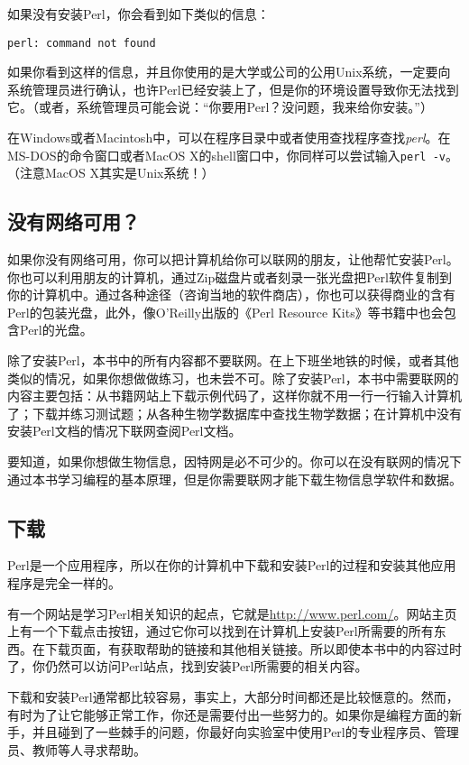 如果没有安装Perl，你会看到如下类似的信息：

\begin{verbatim}
perl: command not found
\end{verbatim}

如果你看到这样的信息，并且你使用的是大学或公司的公用Unix系统，一定要向系统管理员进行确认，也许Perl已经安装上了，但是你的环境设置导致你无法找到它。（或者，系统管理员可能会说：“你要用Perl？没问题，我来给你安装。”）

在Windows或者Macintosh中，可以在程序目录中或者使用查找程序查找\textit{perl}。在MS-DOS的命令窗口或者MacOS X的shell窗口中，你同样可以尝试输入\verb|perl -v|。（注意MacOS X其实是Unix系统！）

\subsection{没有网络可用？}
如果你没有网络可用，你可以把计算机给你可以联网的朋友，让他帮忙安装Perl。你也可以利用朋友的计算机，通过Zip磁盘片或者刻录一张光盘把Perl软件复制到你的计算机中。通过各种途径（咨询当地的软件商店），你也可以获得商业的含有Perl的包装光盘，此外，像O'Reilly出版的《Perl Resource Kits》等书籍中也会包含Perl的光盘。

除了安装Perl，本书中的所有内容都不要联网。在上下班坐地铁的时候，或者其他类似的情况，如果你想做做练习，也未尝不可。除了安装Perl，本书中需要联网的内容主要包括：从书籍网站上下载示例代码了，这样你就不用一行一行输入计算机了；下载并练习测试题；从各种生物学数据库中查找生物学数据；在计算机中没有安装Perl文档的情况下联网查阅Perl文档。

要知道，如果你想做生物信息，因特网是必不可少的。你可以在没有联网的情况下通过本书学习编程的基本原理，但是你需要联网才能下载生物信息学软件和数据。

\subsection{下载}
Perl是一个应用程序，所以在你的计算机中下载和安装Perl的过程和安装其他应用程序是完全一样的。

有一个网站是学习Perl相关知识的起点，它就是\href{http://www.perl.com/}{http://www.perl.com/}。网站主页上有一个下载点击按钮，通过它你可以找到在计算机上安装Perl所需要的所有东西。在下载页面，有获取帮助的链接和其他相关链接。所以即使本书中的内容过时了，你仍然可以访问Perl站点，找到安装Perl所需要的相关内容。

下载和安装Perl通常都比较容易，事实上，大部分时间都还是比较惬意的。然而，有时为了让它能够正常工作，你还是需要付出一些努力的。如果你是编程方面的新手，并且碰到了一些棘手的问题，你最好向实验室中使用Perl的专业程序员、管理员、教师等人寻求帮助。

